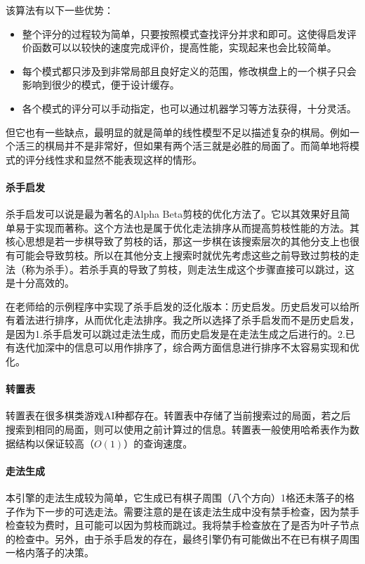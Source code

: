 \documentclass{article}
\begin{document}
该算法有以下一些优势：
\begin{itemize}
    \item 整个评分的过程较为简单，只要按照模式查找评分并求和即可。这使得启发评价函数可以以较快的速度完成评价，提高性能，实现起来也会比较简单。
    \item 每个模式都只涉及到非常局部且良好定义的范围，修改棋盘上的一个棋子只会影响到很少的模式，便于设计缓存。
    \item 各个模式的评分可以手动指定，也可以通过机器学习等方法获得，十分灵活。
\end{itemize}

但它也有一些缺点，最明显的就是简单的线性模型不足以描述复杂的棋局。例如一个活三的棋局并不是非常好，但如果有两个活三就是必胜的局面了。而简单地将模式的评分线性求和显然不能表现这样的情形。

\paragraph{杀手启发} 杀手启发可以说是最为著名的Alpha Beta剪枝的优化方法了。它以其效果好且简单易于实现而著称。这个方法也是属于优化走法排序从而提高剪枝性能的方法。其核心思想是若一步棋导致了剪枝的话，那这一步棋在该搜索层次的其他分支上也很有可能会导致剪枝。所以在其他分支上搜索时就优先考虑这些之前导致过剪枝的走法（称为杀手）。若杀手真的导致了剪枝，则走法生成这个步骤直接可以跳过，这是十分高效的。

在老师给的示例程序中实现了杀手启发的泛化版本：历史启发。历史启发可以给所有着法进行排序，从而优化走法排序。我之所以选择了杀手启发而不是历史启发，是因为1.杀手启发可以跳过走法生成，而历史启发是在走法生成之后进行的。2.已有迭代加深中的信息可以用作排序了，综合两方面信息进行排序不太容易实现和优化。

\paragraph{转置表} 转置表在很多棋类游戏AI种都存在。转置表中存储了当前搜索过的局面，若之后搜索到相同的局面，则可以使用之前计算过的信息。转置表一般使用哈希表作为数据结构以保证较高（$O(1)$）的查询速度。

\paragraph{走法生成} 本引擎的走法生成较为简单，它生成已有棋子周围（八个方向）1格还未落子的格子作为下一步的可选走法。需要注意的是在该走法生成中没有禁手检查，因为禁手检查较为费时，且可能可以因为剪枝而跳过。我将禁手检查放在了是否为叶子节点的检查中。另外，由于杀手启发的存在，最终引擎仍有可能做出不在已有棋子周围一格内落子的决策。
\end{document}
